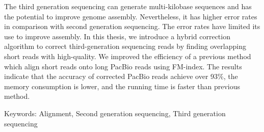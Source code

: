 The third generation sequencing can generate multi-kilobase sequences and has the potential to improve genome assembly. Nevertheless, it has higher error rates in comparison with second generation sequencing. The error rates have limited its use to improve assembly. In this thesis, we introduce a hybrid correction algorithm to correct third-generation sequencing reads by finding overlapping short reads with high-quality. We improved the efficiency of a previous method which align short reads onto long PacBio reads using FM-index. The results indicate that the accuracy of corrected PacBio reads achieve over 93\%, the memory consumption is lower, and the running time is faster than previous method.

Keywords: Alignment, Second generation sequencing, Third generation sequencing